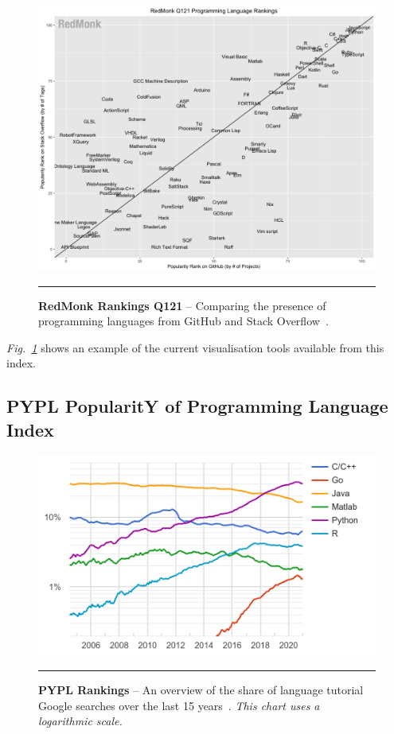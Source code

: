 \smallskip

\begin{figure}[H]
	\centering
        \includegraphics[width=1.0\textwidth]{media/literature/redmonk.png}
        \rule{35em}{0.5pt}
        \caption[RedMonk Programming Language Rankings for first quarter of 2021]{\textbf{RedMonk Rankings Q121} -- Comparing the presence of programming languages from GitHub and Stack Overflow~\citep{redmonk}.}\label{fig:redmonk}
\end{figure}

\textit{Fig.~\ref{fig:redmonk}} shows an example of the current visualisation tools available from this index.


\subsection{PYPL PopularitY of Programming Language Index}

\begin{figure}[H]
	\centering
        \includegraphics[width=1.0\textwidth]{media/literature/pypl.png}
        \rule{35em}{0.5pt}
        \caption[PYPL PopularitY of Programming Language Index]{\textbf{PYPL Rankings} -- An overview of the share of language tutorial Google searches over the last 15 years~\citep{pypl}. \textit{This chart uses a logarithmic scale.}}\label{fig:pypl}
\end{figure}

